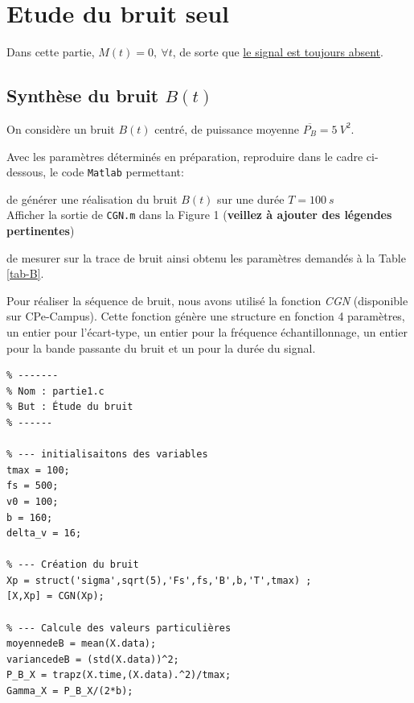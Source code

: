 \documentclass{article}
\begin{document}
\section{Etude du bruit seul}

Dans cette partie, $M(t) = 0,~\forall t$, de sorte que \underline{le signal est toujours absent}.

\subsection{Synthèse du bruit $B(t)$}
\label{sec:bruit-synthese}

On considère un bruit $B(t)$ centré, de puissance moyenne $\overline{P_B} = 5~V^2$.

Avec les paramètres déterminés en préparation, reproduire dans le cadre ci-dessous, le code {\tt Matlab} permettant:
\begin{list}{-}{\setlength{\leftmargin}{3mm} \setlength{\labelwidth}{20mm} \setlength{\labelsep}{2mm} \setlength{\itemsep}{1mm} }
\item de générer une réalisation du bruit $B(t)$ sur une durée $T=100~s$ \\ Afficher la sortie de {\tt CGN.m} dans la Figure 1 ({\bf veillez à ajouter des légendes pertinentes})
\item de mesurer sur la trace de bruit ainsi obtenu les paramètres demandés à la Table \ref{tab-B}.
\end{list}
\newline
Pour réaliser la séquence de bruit, nous avons utilisé la fonction \textit{CGN} (disponible sur CPe-Campus). Cette fonction génère une structure en fonction 4 paramètres, un entier pour l'écart-type, un entier pour la fréquence échantillonnage, un entier pour la bande passante du bruit et un pour la durée du signal.   
\begin{verbatim}
% -------
% Nom : partie1.c
% But : Étude du bruit 
% ------

% --- initialisaitons des variables
tmax = 100;
fs = 500;
v0 = 100;
b = 160;
delta_v = 16;

% --- Création du bruit
Xp = struct('sigma',sqrt(5),'Fs',fs,'B',b,'T',tmax) ;
[X,Xp] = CGN(Xp);

% --- Calcule des valeurs particulières 
moyennedeB = mean(X.data);
variancedeB = (std(X.data))^2;
P_B_X = trapz(X.time,(X.data).^2)/tmax;
Gamma_X = P_B_X/(2*b);
\end{verbatim}
\end{document}
